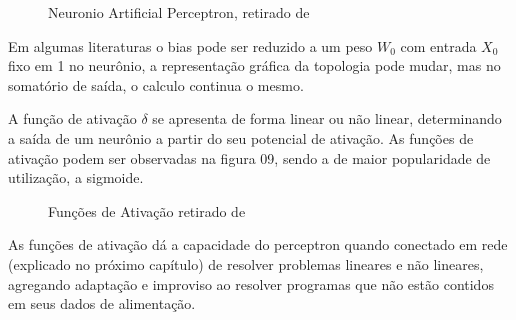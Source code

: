 \documentclass[	12pt, Times, openright, twoside, a4paper, english, brazil]{abntex2}
\begin{document}
            \begin{figure}[!ht]
            \caption{Neuronio Artificial Perceptron, retirado de \cite{Junior2007} \cite{}\label{fig:perceptron}}
            \end{figure}
			
			     Em algumas literaturas o bias pode ser reduzido a um peso $W_0$ com entrada $X_0$ fixo em 1 no neurônio, a representação gráfica da topologia pode mudar, mas no somatório de saída, o calculo continua o mesmo.
			
			     A função de ativação $\delta$ se apresenta de forma linear ou não linear, determinando a saída de um neurônio a partir do seu potencial de ativação. 
			     As funções de ativação podem ser observadas na figura 09, sendo a de maior popularidade de utilização, a sigmoide.
			
			     \begin{figure}[!ht]
    				\caption{Funções de Ativação retirado de \cite{Flavia2014} \label{fig:perceptron2}}
			     \end{figure}
			
				    As funções de ativação dá a capacidade do perceptron quando conectado em rede (explicado no próximo capítulo) de resolver problemas lineares e não lineares, agregando adaptação e improviso ao resolver programas que não estão contidos em seus dados de alimentação.
			
\end{document}
